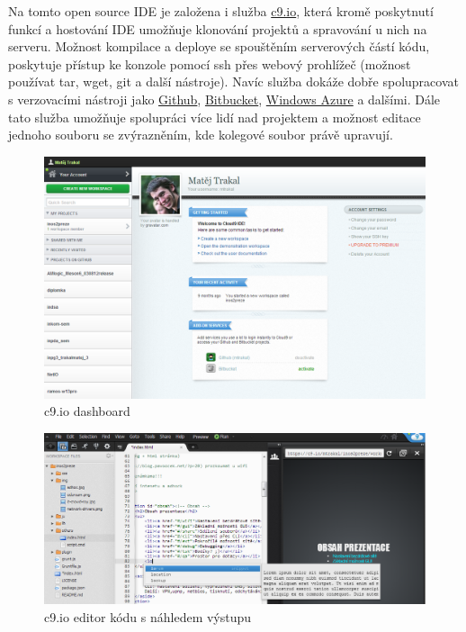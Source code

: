 Na tomto open source IDE je založena i služba \href{https://c9.io/}{c9.io}, která kromě poskytnutí funkcí a hostování IDE umožňuje klonování projektů a spravování u nich na serveru. Možnost kompilace a deploye se spouštěním serverových částí kódu, poskytuje přístup ke konzole pomocí ssh přes webový prohlížeč (možnost používat tar, wget, git a další nástroje). Navíc služba dokáže dobře spolupracovat s verzovacími nástroji jako \href{https://github.com/}{Github}, \href{https://bitbucket.org/}{Bitbucket}, \href{http://www.windowsazure.com}{Windows Azure} a dalšími.
Dále tato služba umožňuje spolupráci více lidí nad projektem a možnost editace jednoho souboru se zvýrazněním, kde kolegové soubor právě upravují.
\begin{figure}[htbp]
	\centering
		\includegraphics[width=1.00\textwidth]{ext/c9ioDashboard.png}
	\caption{c9.io dashboard}
	\label{fig:c9ioDashboard}
\end{figure}

\begin{figure}[htbp]
	\centering
		\includegraphics[width=1.00\textwidth]{ext/c9ioEditor.png}
	\caption{c9.io editor kódu s náhledem výstupu}
	\label{fig:c9ioEditor}
\end{figure}

